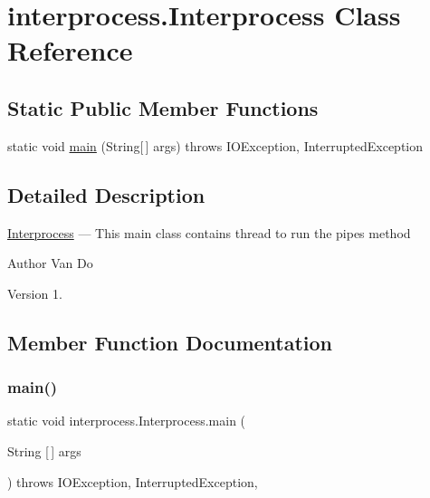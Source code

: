 \hypertarget{classinterprocess_1_1_interprocess}{}\section{interprocess.\+Interprocess Class Reference}
\label{classinterprocess_1_1_interprocess}
\subsection*{Static Public Member Functions}
\begin{DoxyCompactItemize}
\item 
static void \hyperlink{classinterprocess_1_1_interprocess_a62de3e766ef3c3c70e60feda45bd3557}{main} (String\mbox{[}$\,$\mbox{]} args)  throws I\+O\+Exception, Interrupted\+Exception      
\end{DoxyCompactItemize}


\subsection{Detailed Description}
\hyperlink{classinterprocess_1_1_interprocess}{Interprocess} --- This main class contains thread to run the pipes method \begin{DoxyAuthor}{Author}
Van Do 
\end{DoxyAuthor}
\begin{DoxyVersion}{Version}
1. 
\end{DoxyVersion}


\subsection{Member Function Documentation}
\mbox{\label{classinterprocess_1_1_interprocess_a62de3e766ef3c3c70e60feda45bd3557}} 
\subsubsection{\texorpdfstring{main()}{main()}}
{\footnotesize\ttfamily static void interprocess.\+Interprocess.\+main (\begin{DoxyParamCaption}\item[{String \mbox{[}$\,$\mbox{]}}]{args }\end{DoxyParamCaption}) throws I\+O\+Exception, Interrupted\+Exception\hspace{0.3cm}{\ttfamily [inline]}, {\ttfamily [static]}}


